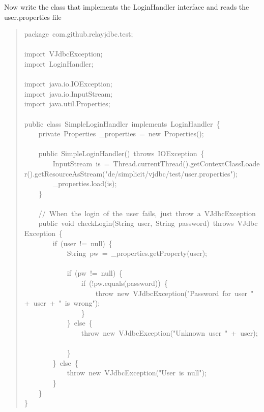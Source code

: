 \documentclass[10pt,a4paper,english]{article}
\begin{document}
Now write the class that implements the LoginHandler interface and reads the user.properties file
\begin{quote}{\ttfamily \raggedright \noindent
package~com.github.relayjdbc.test;~\\
~\\
import~VJdbcException;~\\
import~LoginHandler;~\\
~\\
import~java.io.IOException;~\\
import~java.io.InputStream;~\\
import~java.util.Properties;~\\
~\\
public~class~SimpleLoginHandler~implements~LoginHandler~{\{}~\\
~~~~private~Properties~{\_}properties~=~new~Properties();~\\
~\\
~~~~public~SimpleLoginHandler()~throws~IOException~{\{}~\\
~~~~~~~~InputStream~is~=~Thread.currentThread().getContextClassLoader().getResourceAsStream("de/simplicit/vjdbc/test/user.properties");~\\
~~~~~~~~{\_}properties.load(is);~\\
~~~~{\}}~\\
~\\
~~~~//~When~the~login~of~the~user~fails,~just~throw~a~VJdbcException~\\
~~~~public~void~checkLogin(String~user,~String~password)~throws~VJdbcException~{\{}~\\
~~~~~~~~if~(user~!=~null)~{\{}~\\
~~~~~~~~~~~~String~pw~=~{\_}properties.getProperty(user);~\\
~\\
~~~~~~~~~~~~if~(pw~!=~null)~{\{}~\\
~~~~~~~~~~~~~~~~if~(!pw.equals(password))~{\{}~\\
~~~~~~~~~~~~~~~~~~~~throw~new~VJdbcException("Password~for~user~"~+~user~+~"~is~wrong");~\\
~~~~~~~~~~~~~~~~{\}}~\\
~~~~~~~~~~~~{\}}~else~{\{}~\\
~~~~~~~~~~~~~~~~throw~new~VJdbcException("Unknown~user~"~+~user);~\\
~~~~~~~~~~~~{\}}~\\
~~~~~~~~{\}}~else~{\{}~\\
~~~~~~~~~~~~throw~new~VJdbcException("User~is~null");~\\
~~~~~~~~{\}}~\\
~~~~{\}}~\\
{\}}
}\end{quote}
\end{document}
